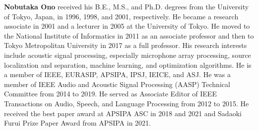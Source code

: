 \documentclass[sip,biber]{now-journal}
\begin{document}
\noindent\normalsize\textbf{Nobutaka Ono}
received his B.E., M.S., and Ph.D. degrees from the University of Tokyo, Japan, in 1996, 1998, and 2001, respectively.
He became a research associate in 2001 and a lecturer in 2005 at the University of Tokyo.
He moved to the National Institute of Informatics in 2011 as an associate professor and then to Tokyo Metropolitan University in 2017 as a full professor.
His research interests include acoustic signal processing, especially microphone array processing, source localization and separation, machine learning, and optimization algorithms.
He is a member of IEEE, EURASIP, APSIPA, IPSJ, IEICE, and ASJ.
He was a member of IEEE Audio and Acoustic Signal Processing (AASP) Technical Committee from 2014 to 2019.
He served as Associate Editor of IEEE Transactions on Audio, Speech, and Language Processing from 2012 to 2015.
He received the best paper award at APSIPA ASC in 2018 and 2021 and Sadaoki Furui Prize Paper Award from APSIPA in 2021.

\printbibliography
\end{document}

